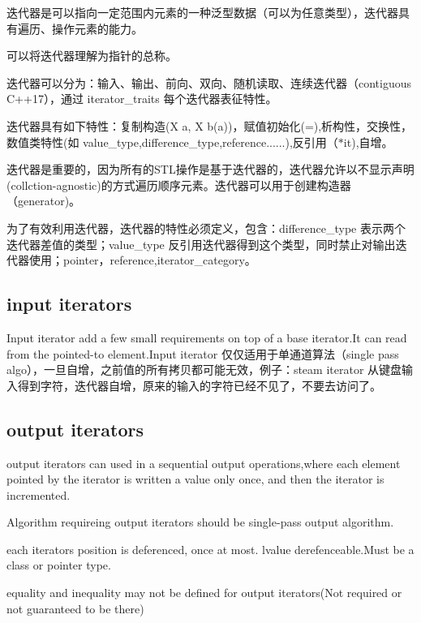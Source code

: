 迭代器是可以指向一定范围内元素的一种泛型数据（可以为任意类型），迭代器具有遍历、操作元素的能力。

可以将迭代器理解为指针的总称。

迭代器可以分为：输入、输出、前向、双向、随机读取、连续迭代器（contiguous C++17），通过 iterator\+\_\+traits 每个迭代器表征特性。

迭代器具有如下特性：复制构造(\+X a, X b(a))，赋值初始化(=),析构性，交换性，数值类特性(如 value\+\_\+type,difference\+\_\+type,reference......),反引用（$\ast$it),自增。

迭代器是重要的，因为所有的\+S\+T\+L操作是基于迭代器的，迭代器允许以不显示声明(collction-\/agnostic)的方式遍历顺序元素。迭代器可以用于创建构造器（generator)。

为了有效利用迭代器，迭代器的特性必须定义，包含：difference\+\_\+type 表示两个迭代器差值的类型；value\+\_\+type 反引用迭代器得到这个类型，同时禁止对输出迭代器使用；pointer，reference,iterator\+\_\+category。

\subsection*{input iterators}

Input iterator add a few small requirements on top of a base iterator.\+It can read from the pointed-\/to element.\+Input iterator 仅仅适用于单通道算法（single pass algo），一旦自增，之前值的所有拷贝都可能无效，例子：steam iterator 从键盘输入得到字符，迭代器自增，原来的输入的字符已经不见了，不要去访问了。

\subsection*{output iterators}

output iterators can used in a sequential output operations,where each element pointed by the iterator is written a value only once, and then the iterator is incremented.

Algorithm requireing output iterators should be single-\/pass output algorithm.


\begin{DoxyItemize}
\item each iterator\textquotesingle{}s position is deferenced, once at most. lvalue derefenceable.\+Must be a class or pointer type.
\item equality and inequality may not be defined for output iterators(\+Not required or not guaranteed to be there)
\end{DoxyItemize}


